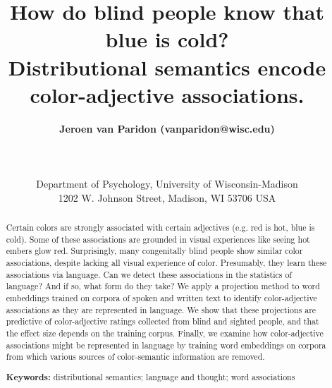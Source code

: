\documentclass[10pt,letterpaper]{article}
\title{How do blind people know that blue is cold? \\ Distributional semantics encode color-adjective associations.}
\author{{\large \bf Jeroen van Paridon (vanparidon@wisc.edu)} \\
  \AND {\large \bf Qiawen Liu (qliu295@wisc.edu)} \\
  \AND {\large \bf Gary Lupyan (lupyan@wisc.edu)} \\
  \\
  Department of Psychology, University of Wisconsin-Madison \\
  1202 W. Johnson Street, Madison, WI 53706 USA}
\begin{document}
\maketitle

\begin{abstract}
Certain colors are strongly associated with certain adjectives (e.g. red is hot, blue is cold). Some of these associations are grounded in visual experiences like seeing hot embers glow red. Surprisingly, many congenitally blind people show similar color associations, despite lacking all visual experience of color. Presumably, they learn these associations via language. Can we detect these associations in the statistics of language? And if so, what form do they take? We apply a projection method to word embeddings trained on corpora of spoken and written text to identify color-adjective associations as they are represented in language. We show that these projections are predictive of color-adjective ratings collected from blind and sighted people, and that the effect size depends on the training corpus. Finally, we examine how color-adjective associations might be represented in language by training word embeddings on corpora from which various sources of color-semantic information are removed.

\textbf{Keywords:}
distributional semantics; language and thought; word associations
\end{abstract}
\end{document}
